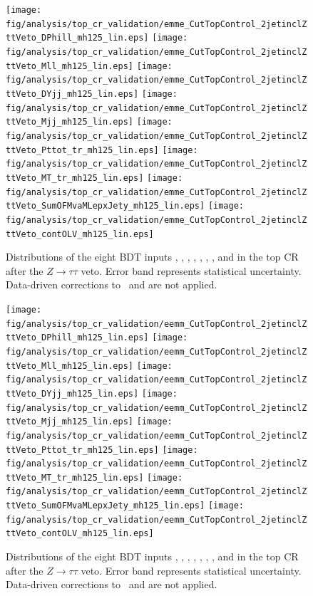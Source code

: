 \begin{figure}[p!]
  \centering
   \texttt{[image: fig/analysis/top\_cr\_validation/emme\_CutTopControl\_2jetinclZttVeto\_DPhill\_mh125\_lin.eps]}
   \texttt{[image: fig/analysis/top\_cr\_validation/emme\_CutTopControl\_2jetinclZttVeto\_Mll\_mh125\_lin.eps]}
   \texttt{[image: fig/analysis/top\_cr\_validation/emme\_CutTopControl\_2jetinclZttVeto\_DYjj\_mh125\_lin.eps]}
   \texttt{[image: fig/analysis/top\_cr\_validation/emme\_CutTopControl\_2jetinclZttVeto\_Mjj\_mh125\_lin.eps]}
   \texttt{[image: fig/analysis/top\_cr\_validation/emme\_CutTopControl\_2jetinclZttVeto\_Pttot\_tr\_mh125\_lin.eps]}
   \texttt{[image: fig/analysis/top\_cr\_validation/emme\_CutTopControl\_2jetinclZttVeto\_MT\_tr\_mh125\_lin.eps]}
   \texttt{[image: fig/analysis/top\_cr\_validation/emme\_CutTopControl\_2jetinclZttVeto\_SumOFMvaMLepxJety\_mh125\_lin.eps]}
   \texttt{[image: fig/analysis/top\_cr\_validation/emme\_CutTopControl\_2jetinclZttVeto\_contOLV\_mh125\_lin.eps]}
   \caption{Distributions
   of the eight BDT inputs \dphill, \mll, \dyjj, \mjj, \pTtot, \mT, \SumMlj, and \lepEtaCent
   in the \emme top CR after the $Z\rightarrow{\tau\tau}$ veto. Error
   band represents statistical uncertainty. Data-driven corrections to
   \ttbar~and \ZDY are not applied.}
  \label{chap:analysis:fig:bdt_inputs_topcr_df}
\end{figure}

\begin{figure}[p!]
  \centering
  \texttt{[image: fig/analysis/top\_cr\_validation/eemm\_CutTopControl\_2jetinclZttVeto\_DPhill\_mh125\_lin.eps]}
   \texttt{[image: fig/analysis/top\_cr\_validation/eemm\_CutTopControl\_2jetinclZttVeto\_Mll\_mh125\_lin.eps]}
   \texttt{[image: fig/analysis/top\_cr\_validation/eemm\_CutTopControl\_2jetinclZttVeto\_DYjj\_mh125\_lin.eps]}
   \texttt{[image: fig/analysis/top\_cr\_validation/eemm\_CutTopControl\_2jetinclZttVeto\_Mjj\_mh125\_lin.eps]}
   \texttt{[image: fig/analysis/top\_cr\_validation/eemm\_CutTopControl\_2jetinclZttVeto\_Pttot\_tr\_mh125\_lin.eps]}
   \texttt{[image: fig/analysis/top\_cr\_validation/eemm\_CutTopControl\_2jetinclZttVeto\_MT\_tr\_mh125\_lin.eps]}
   \texttt{[image: fig/analysis/top\_cr\_validation/eemm\_CutTopControl\_2jetinclZttVeto\_SumOFMvaMLepxJety\_mh125\_lin.eps]}
   \texttt{[image: fig/analysis/top\_cr\_validation/eemm\_CutTopControl\_2jetinclZttVeto\_contOLV\_mh125\_lin.eps]}
   \caption{Distributions
   of the eight BDT inputs \dphill, \mll, \dyjj, \mjj, \pTtot, \mT, \SumMlj, and \lepEtaCent
   in the \eemm top CR after the $Z\rightarrow{\tau\tau}$ veto. Error
   band represents statistical uncertainty. Data-driven corrections to
   \ttbar~and \ZDY are not applied.}
  \label{chap:analysis:fig:bdt_inputs_topcr_sf}
\end{figure}

